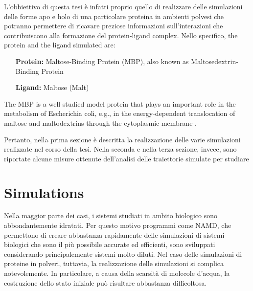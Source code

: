 L'obbiettivo di questa tesi è infatti proprio quello di realizzare delle simulazioni delle forme apo e holo di una particolare proteina in ambienti polvesi che potranno permettere di ricavare preziose informazioni sull'interazioni che contribuiscono alla formazione del protein-ligand complex. Nello specifico, the protein and the ligand simulated are:
\begin{center}
\begin{minipage}{0.65\textwidth}
\begin{itemize}
\item[\textbf{Protein:}] Maltose-Binding Protein (MBP), also known as Maltosedextrin-Binding Protein
\vspace{-0.2cm}
\item[\textbf{Ligand:}] Maltose (Malt)
\end{itemize}
\end{minipage}
\end{center}
The MBP is a well studied model protein that plays an important role in the metabolism of Escherichia coli, e.g., in the energy-dependent translocation of maltose and maltodextrins through the cytoplasmic membrane \cite{paciaroni2008fingerprints}.




Pertanto, nella prima sezione è descritta la realizzazione delle varie simulazioni realizzate nel corso della tesi. Nella seconda e nella terza sezione, invece, sono riportate alcune misure ottenute dell'analisi delle traiettorie simulate per studiare 

\section{Simulations}
Nella maggior parte dei casi, i sistemi studiati in ambito biologico sono abbondantemente idratati. Per questo motivo programmi come NAMD, che permettono di creare abbastanza rapidamente delle simulazioni di sistemi biologici che sono il più possibile accurate ed efficienti, sono sviluppati considerando principalemente sistemi molto diluti. Nel caso delle simulazioni di proteine in polveri, tuttavia, la realizzazione delle simulazioni si complica notevolemente. In particolare, a causa della scarsità di molecole d'acqua, la costruzione dello stato iniziale può risultare abbastanza difficoltosa.

